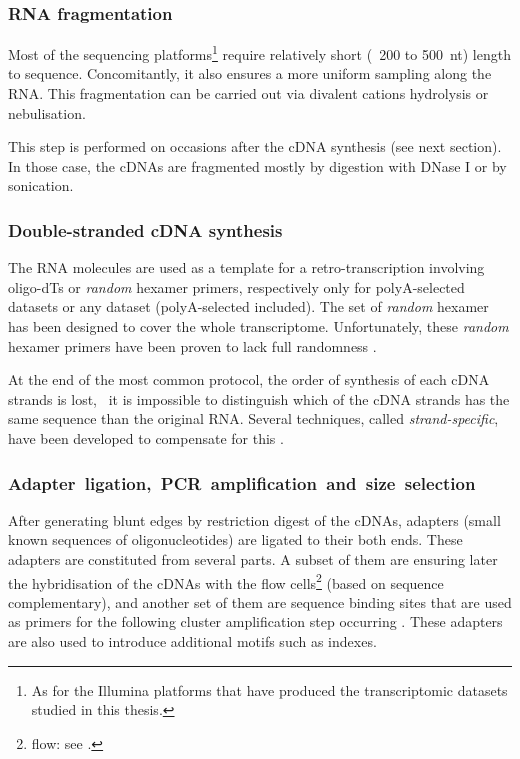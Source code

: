 \subsubsection{RNA fragmentation}

Most of the sequencing platforms\footnote{As for the Illumina platforms that have
produced the transcriptomic datasets studied in this thesis.} require relatively
short (\ie\ 200 to 500\ nt) length to sequence. Concomitantly, it also ensures
a more uniform sampling along the \gls{RNA}.
This fragmentation can be carried out via divalent cations hydrolysis or
nebulisation.

This step is performed on occasions after the \gls{cDNA} synthesis
(see next section). In those case, the \glspl{cDNA} are fragmented mostly
by digestion with DNase I or by sonication.

\subsubsection{Double-stranded cDNA synthesis}
The \gls{RNA} molecules are used as a template for a retro-transcription
involving oligo-dTs or \emph{random} hexamer primers, respectively only
for polyA-selected datasets or any dataset (polyA-selected included).
The set of \emph{random} hexamer has been designed to cover the whole
transcriptome. Unfortunately, these \emph{random} hexamer primers have been
proven to lack full randomness .

At the end of the most common protocol, the order of synthesis of each \gls{cDNA}
strands is lost, \ie\ it is impossible to distinguish which of the \gls{cDNA}
strands has the same sequence than the original \gls{RNA}. Several techniques,
called \emph{strand-specific}, have been developed to compensate for this
.\label{strand-specific}

\subsubsection{Adapter~ligation,~PCR~amplification~and~size~selection}

After generating blunt edges by restriction digest of the \glspl{cDNA}, adapters
(small known sequences of oligonucleotides) are ligated to their both ends.
These adapters are constituted from several parts. A subset of them are ensuring
later the hybridisation of the \glspl{cDNA} with the flow
cells\footnote{\Gls{flow}: see .} (based on sequence
complementary), and another set of them
are sequence binding sites that are used as primers for the following cluster
amplification step occurring . These adapters are also used to
introduce additional motifs such as indexes.


